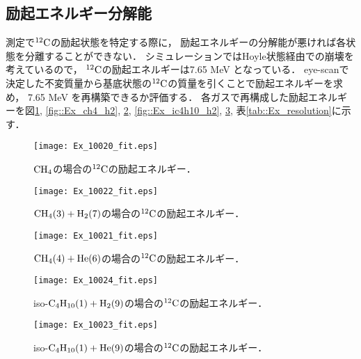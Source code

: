 \documentclass[../master]{subfiles}
\begin{document}
\subsection{励起エネルギー分解能}
測定で${}^{12}{\rm C}$の励起状態を特定する際に，
励起エネルギーの分解能が悪ければ各状態を分離することができない．
シミュレーションではHoyle状態経由での崩壊を考えているので，
${}^{12}{\rm C}$の励起エネルギーは7.65 MeV となっている．
eye-scanで決定した不変質量から基底状態の${}^{12}{\rm C}$の質量を引くことで励起エネルギーを求め，
7.65 MeV を再構築できるか評価する．
各ガスで再構成した励起エネルギーを図\ref{fig::Ex_ch4}, \ref{fig::Ex_ch4_h2}, \ref{fig::Ex_ch4_he},
\ref{fig::Ex_ic4h10_h2}, \ref{fig::Ex_ic4h10_he}, 表\ref{tab::Ex_resolution}に示す．
\begin{figure}
  \centering
  \begin{minipage}{0.45\columnwidth}
    \centering
    \texttt{[image: Ex\_10020\_fit.eps]}
    \caption{$\rm CH_{4}$の場合の${}^{12}{\rm C}$の励起エネルギー．}
    \label{fig::Ex_ch4}
  \end{minipage}
\end{figure}
\begin{figure}
  \centering
  \begin{minipage}{0.45\columnwidth}
    \centering
    \texttt{[image: Ex\_10022\_fit.eps]}
    \caption{$\rm CH_{4} (3) + H_{2} (7)$の場合の${}^{12}{\rm C}$の励起エネルギー．}
    \label{fig::Ex_ch4_h2}
  \end{minipage}
  \begin{minipage}{0.45\columnwidth}
    \centering
    \texttt{[image: Ex\_10021\_fit.eps]}
    \caption{$\rm CH_{4} (4) + He (6)$の場合の${}^{12}{\rm C}$の励起エネルギー．}
    \label{fig::Ex_ch4_he}
  \end{minipage}
\end{figure}
\begin{figure}
  \centering
  \begin{minipage}{0.45\columnwidth}
    \centering
    \texttt{[image: Ex\_10024\_fit.eps]}
    \caption{iso-$\rm C_{4}H_{10} (1) + H_{2} (9)$の場合の${}^{12}{\rm C}$の励起エネルギー．}
    \label{fig::Ex_ic4h10_h2}
  \end{minipage}
  \begin{minipage}{0.45\columnwidth}
    \centering
    \texttt{[image: Ex\_10023\_fit.eps]}
    \caption{iso-$\rm C_{4}H_{10} (1) + He (9)$の場合の${}^{12}{\rm C}$の励起エネルギー．}
    \label{fig::Ex_ic4h10_he}
  \end{minipage}
\end{figure}
\end{document}
